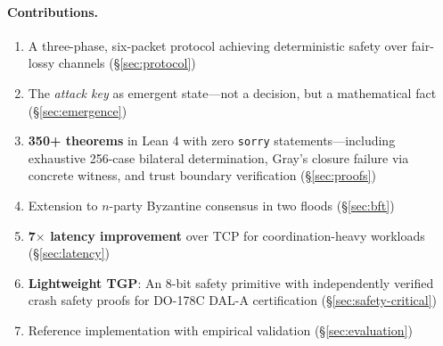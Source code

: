 \paragraph{Contributions.}
\begin{enumerate}
    \item A three-phase, six-packet protocol achieving deterministic safety over fair-lossy channels (\S\ref{sec:protocol})
    \item The \emph{attack key} as emergent state---not a decision, but a mathematical fact (\S\ref{sec:emergence})
    \item \textbf{350+ theorems} in Lean 4 with zero \texttt{sorry} statements---including exhaustive 256-case bilateral determination, Gray's closure failure via concrete witness, and trust boundary verification (\S\ref{sec:proofs})
    \item Extension to $n$-party Byzantine consensus in two floods (\S\ref{sec:bft})
    \item \textbf{7$\times$ latency improvement} over TCP for coordination-heavy workloads (\S\ref{sec:latency})
    \item \textbf{Lightweight TGP}: An 8-bit safety primitive with independently verified crash safety proofs for DO-178C DAL-A certification (\S\ref{sec:safety-critical})
    \item Reference implementation with empirical validation (\S\ref{sec:evaluation})
\end{enumerate}
